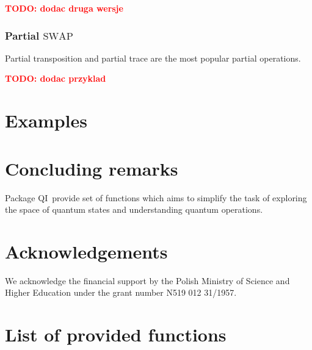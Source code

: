 \documentclass[final,3p,times]{elsarticle}
\newcommand{\1}{{\rm 1\hspace{-0.9mm}l}}
\newcommand{\SWAP}{\ensuremath{\mathrm{SWAP}}}
\newcommand{\qi}{QI}
\newcommand{\todo}[1]{\textcolor{red}{\bf TODO: #1}}
\begin{document}
\todo{dodac druga wersje}

\subsubsection{Partial \SWAP}
Partial transposition and partial trace are the most popular partial operations.

\todo{dodac przyklad}

\section{Examples}\label{sec:examples}


\section{Concluding remarks}\label{sec:comclude}
Package \qi\ provide set of functions which aims to simplify the task of
exploring the space of quantum states and understanding quantum operations.

\section*{Acknowledgements}
We acknowledge the financial support by the Polish
Ministry of Science and Higher Education under the grant number N519 012
31/1957. 

\appendix
\section{List of provided functions}





\end{document}
